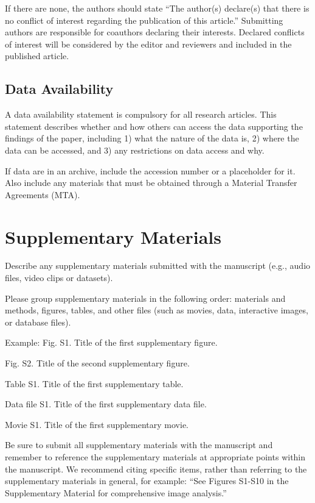 \documentclass{article}
\begin{document}
If there are none, the authors should state ``The author(s) declare(s) that there is no conflict of interest regarding the publication of this article.'' Submitting authors are responsible for coauthors declaring their interests. Declared conflicts of interest will be considered by the editor and reviewers and included in the published article.

\subsection*{Data Availability}
A data availability statement is compulsory for all research articles. This statement describes whether and how others can access the data supporting the findings of the paper, including 1) what the nature of the data is, 2) where the data can be accessed, and 3) any restrictions on data access and why.

If data are in an archive, include the accession number or a placeholder for it. Also include any materials that must be obtained through a Material Transfer Agreements (MTA). 

\section*{Supplementary Materials}
Describe any supplementary materials submitted with the manuscript (e.g., audio files, video clips or datasets). 

Please group supplementary materials in the following order: materials and methods, figures, tables, and other files (such as movies, data, interactive images, or database files). 

\medskip Example:
Fig. S1. Title of the first supplementary figure.

Fig. S2. Title of the second supplementary figure.

Table S1. Title of the first supplementary table.

Data file S1. Title of the first supplementary data file.

Movie S1. Title of the first supplementary movie.

\medskip
Be sure to submit all supplementary materials with the manuscript and remember to reference the supplementary materials at appropriate points within the manuscript. We recommend citing specific items, rather than referring to the supplementary materials in general, for example: ``See Figures S1-S10 in the Supplementary Material for comprehensive image analysis.''
\end{document}
